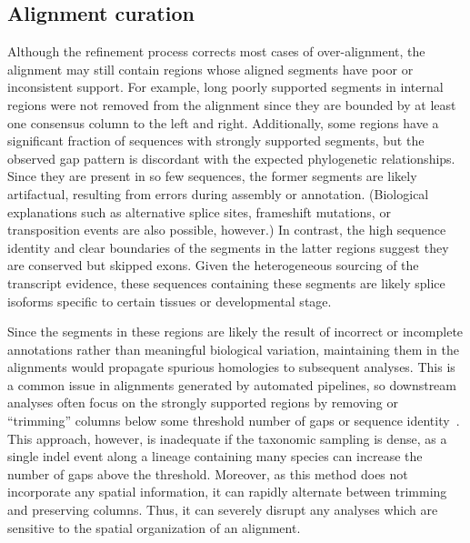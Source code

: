 \subsection*{Alignment curation}
Although the refinement process corrects most cases of over-alignment, the alignment may still contain regions whose aligned segments have poor or inconsistent support. For example, long poorly supported segments in internal regions were not removed from the alignment since they are bounded by at least one consensus column to the left and right. Additionally, some regions have a significant fraction of sequences with strongly supported segments, but the observed gap pattern is discordant with the expected phylogenetic relationships. Since they are present in so few sequences, the former segments are likely artifactual, resulting from errors during assembly or annotation. (Biological explanations such as alternative splice sites, frameshift mutations, or transposition events are also possible, however.) In contrast, the high sequence identity and clear boundaries of the segments in the latter regions suggest they are conserved but skipped exons. Given the heterogeneous sourcing of the transcript evidence, these sequences containing these segments are likely splice isoforms specific to certain tissues or developmental stage.


Since the segments in these regions are likely the result of incorrect or incomplete annotations rather than meaningful biological variation, maintaining them in the alignments would propagate spurious homologies to subsequent analyses. This is a common issue in alignments generated by automated pipelines, so downstream analyses often focus on the strongly supported regions by removing or “trimming” columns below some threshold number of gaps or sequence identity~\cite{Castresana2000, CapellaGutierrez2009}. This approach, however, is inadequate if the taxonomic sampling is dense, as a single indel event along a lineage containing many species can increase the number of gaps above the threshold. Moreover, as this method does not incorporate any spatial information, it can rapidly alternate between trimming and preserving columns. Thus, it can severely disrupt any analyses which are sensitive to the spatial organization of an alignment.

